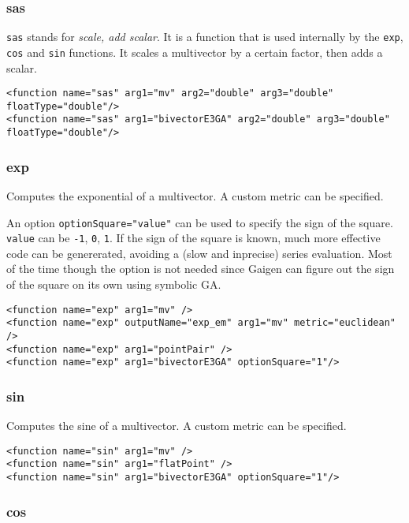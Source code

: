 \documentclass[10pt, a4paper]{article}
\begin{document}
\subsubsection*{sas}

{\tt sas} stands for \emph{scale, add scalar}. 
It is a function that is used internally
by the {\tt exp}, {\tt cos} and {\tt sin} functions.
It scales a multivector by a certain factor, then adds a scalar.
\begin{verbatim}
<function name="sas" arg1="mv" arg2="double" arg3="double" floatType="double"/>
<function name="sas" arg1="bivectorE3GA" arg2="double" arg3="double" floatType="double"/>
\end{verbatim}

\subsubsection*{exp}

Computes the exponential of a multivector.
A custom metric can be specified.

An option {\tt optionSquare="value"} can be used to specify the 
sign of the square. {\tt value} can be {\tt -1}, {\tt 0}, {\tt 1}.
If the sign of the square is known, much more effective code can be genererated, avoiding 
a (slow and inprecise) series evaluation. Most of the time though the option is
not needed since Gaigen can figure out the sign of the square on its own using symbolic GA. 
\begin{verbatim}
<function name="exp" arg1="mv" />
<function name="exp" outputName="exp_em" arg1="mv" metric="euclidean" />
<function name="exp" arg1="pointPair" />
<function name="exp" arg1="bivectorE3GA" optionSquare="1"/>
\end{verbatim}

\subsubsection*{sin}

Computes the sine of a multivector.
A custom metric can be specified.
\begin{verbatim}
<function name="sin" arg1="mv" />
<function name="sin" arg1="flatPoint" />
<function name="sin" arg1="bivectorE3GA" optionSquare="1"/>
\end{verbatim}

\subsubsection*{cos}
\end{document}
